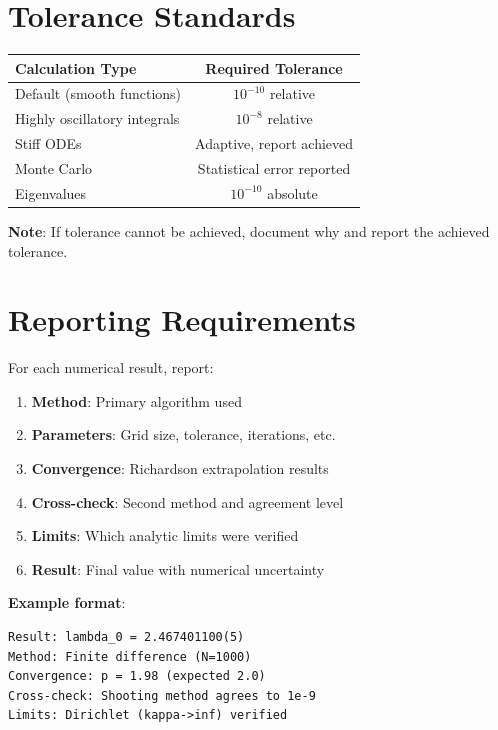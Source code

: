 \section{Tolerance Standards}

\begin{center}
\begin{tabular}{lc}
\toprule
\textbf{Calculation Type} & \textbf{Required Tolerance} \\
\midrule
Default (smooth functions) & $10^{-10}$ relative \\
Highly oscillatory integrals & $10^{-8}$ relative \\
Stiff ODEs & Adaptive, report achieved \\
Monte Carlo & Statistical error reported \\
Eigenvalues & $10^{-10}$ absolute \\
\bottomrule
\end{tabular}
\end{center}

\textbf{Note}: If tolerance cannot be achieved, document why and
report the achieved tolerance.

\section{Reporting Requirements}

For each numerical result, report:

\begin{enumerate}
\item \textbf{Method}: Primary algorithm used
\item \textbf{Parameters}: Grid size, tolerance, iterations, etc.
\item \textbf{Convergence}: Richardson extrapolation results
\item \textbf{Cross-check}: Second method and agreement level
\item \textbf{Limits}: Which analytic limits were verified
\item \textbf{Result}: Final value with numerical uncertainty
\end{enumerate}

\textbf{Example format}:
\begin{verbatim}
Result: lambda_0 = 2.467401100(5)
Method: Finite difference (N=1000)
Convergence: p = 1.98 (expected 2.0)
Cross-check: Shooting method agrees to 1e-9
Limits: Dirichlet (kappa->inf) verified
\end{verbatim}


